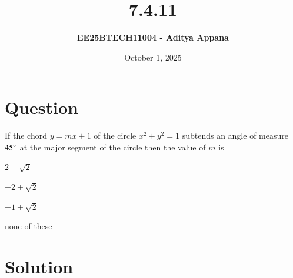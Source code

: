 \documentclass[12pt]{article}
\title{\textbf{7.4.11}}
\author{\textbf{EE25BTECH11004 - Aditya Appana}}
\date{October 1, 2025}
\begin{document}
\maketitle

\section*{Question}
If the chord $y = mx + 1$ of the circle $x^2 + y^2 = 1$ subtends an angle of measure $45\degree$
at the major segment of the circle then the value of $m$ is
\begin{enumerate}
\begin{multicols}{4}
    \item $2 \pm \sqrt{2}$
    \item $-2 \pm \sqrt{2}$
    \item $-1 \pm \sqrt{2}$
    \item none of these
    
    \end{multicols}
\end{enumerate}

\section*{Solution}
\end{document}
